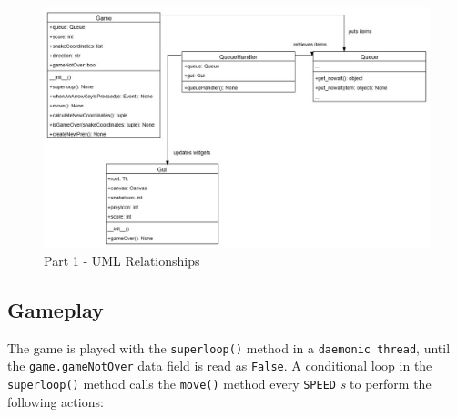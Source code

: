\documentclass{article}
\begin{document}
\begin{figure}[H]
    \centering
     \includegraphics[width=1.0\textwidth]{../Part_1_ClassDiagrams.jpg}
     \caption{Part 1 - UML Relationships}
     \label{fig:Part1_ClassDiagrams}
 \end{figure}

\subsection{Gameplay}

The game is played with the \texttt{superloop()} method in a \texttt{daemonic thread}, until the \texttt{game.gameNotOver} data field is read as \texttt{False}.
A conditional loop in the \texttt{superloop()} method calls the \texttt{move()} method
every \texttt{SPEED} \textit{s} to perform the following actions:
\end{document}
